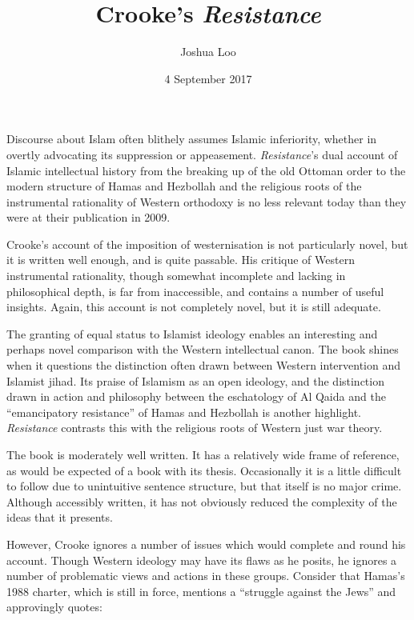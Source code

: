 \documentclass[10pt,a4paper]{article}
\newcounter{count}
\begin{document}
\setcounter{section}{-1}
\title{Crooke's \textit{Resistance}}
\date{4 September 2017}
\author{Joshua Loo}

\maketitle

\begin{multicols}{2}
	
	Discourse about Islam often blithely assumes Islamic inferiority,
	whether in overtly advocating its suppression or appeasement.
	\textit{Resistance}'s dual account of Islamic intellectual history from
	the breaking up of the old Ottoman order to the modern structure of
	Hamas and Hezbollah and the religious roots of the instrumental
	rationality of Western orthodoxy is no less relevant today than they
	were at their publication in 2009.
	
	Crooke's account of the imposition of westernisation is not particularly
	novel, but it is written well enough, and is quite passable. His
	critique of Western instrumental rationality, though somewhat incomplete
	and lacking in philosophical depth, is far from inaccessible, and
	contains a number of useful insights. Again, this account is not
	completely novel, but it is still adequate.
	
	The granting of equal status to Islamist ideology enables an interesting
	and perhaps novel comparison with the Western intellectual canon. The
	book shines when it questions the distinction often drawn between
	Western intervention and Islamist jihad. Its praise of Islamism as an
	open ideology, and the distinction drawn in action and philosophy
	between the eschatology of Al Qaida and the ``emancipatory resistance''
	of Hamas and Hezbollah is another highlight. \textit{Resistance} contrasts
	this with the religious roots of Western just war theory.
	
	The book is moderately well written. It has a relatively wide frame of
	reference, as would be expected of a book with its thesis. Occasionally
	it is a little difficult to follow due to unintuitive sentence
	structure, but that itself is no major crime. Although accessibly
	written, it has not obviously reduced the complexity of the ideas that
	it presents.
	
	However, Crooke ignores a number of issues which would complete and
	round his account. Though Western ideology may have its flaws as he
	posits, he ignores a number of problematic views and actions in these
	groups. Consider that Hamas's 1988 charter, which is still in force,
	mentions a ``struggle against the Jews'' and approvingly quotes:
	

\end{multicols}
\end{document}
